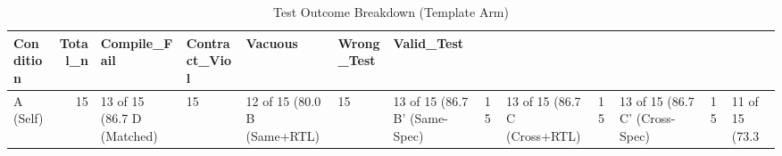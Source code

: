 \begin{table}
\caption{Test Outcome Breakdown (Template Arm)}
\label{tab:outcomes_template}
\begin{tabular}{lrlllll}
\toprule
Condition & Total_n & Compile_Fail & Contract_Viol & Vacuous & Wrong_Test & Valid_Test \\
\midrule
A (Self) & 15 & 13 of 15 (86.7%
D (Matched) & 15 & 12 of 15 (80.0%
B (Same+RTL) & 15 & 13 of 15 (86.7%
B' (Same-Spec) & 15 & 13 of 15 (86.7%
C (Cross+RTL) & 15 & 13 of 15 (86.7%
C' (Cross-Spec) & 15 & 11 of 15 (73.3%
\bottomrule
\end{tabular}
\end{table}
